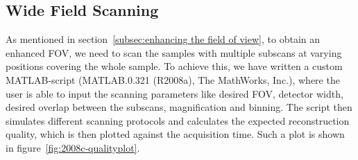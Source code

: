
\subsection{Wide Field Scanning}
As mentioned in section~\ref{subsec:enhancing the field of view}, to obtain an enhanced FOV, we need to scan the samples with multiple subscans at varying positions covering the whole sample. To achieve this, we have written a custom MATLAB-script (MATLAB.0.321 (R2008a), The MathWorks, Inc.), where the user is able to input the scanning parameters like desired FOV, detector width, desired overlap between the subscans, magnification and binning. The script then simulates different scanning protocols and calculates the expected reconstruction quality, which is then plotted against the acquisition time. Such a plot is shown in figure~\ref{fig:2008c-qualityplot}.

\begin{figure*}
	\centering
	\caption[Quality-Plot of 34 calculated protocols]{Quality-Plot of 34 calculated protocols. The red dots show the expected quality of the different protocols, the black plot is a polynomial fit $p(x)$ with $n=4$ for $p(x)=p_{1}x^{n}+p_{2}x^{n-1}+\cdots+p_{n}x+p_{n+1}$. A subset of 19 protocols have been scanned. Details of these scans are shown in table~\ref{tab:projections} and are discussed in section~\ref{sec:Results}.}%
	\label{fig:2008c-qualityplot}%
\end{figure*}



